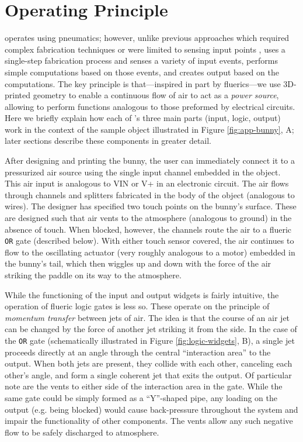   \section{\al Operating Principle}
    \al operates using pneumatics; however, unlike previous approaches
    which required complex fabrication techniques
    \cite{He:2017,Vazquez:2015,Slyper:2012} or were limited to sensing
    input points \cite{Tejada:2018, Tejada:2020}, \al uses a single-step
    fabrication process and senses a variety of input events, performs
    simple computations based on those events, and creates output based on
    the computations. The key principle is that---inspired in part by
    fluerics---we use 3D-printed geometry to enable a continuous flow of
    air to act as a \textit{power source}, allowing \al to perform
    functions analogous to those preformed by electrical circuits. Here we
    briefly explain how each of \al's three main parts (input, logic,
    output) work in the context of the sample object illustrated in
    Figure \ref{fig:app-bunny}, A; later sections describe these components in
    greater detail.

    After designing and printing the bunny, the user can immediately
    connect it to a pressurized air source using the single input channel
    embedded in the object. This air input is analogous to VIN or V+ in an
    electronic circuit. The air flows through channels and splitters
    fabricated in the body of the object (analogous to wires). The designer
    has specified two touch points on the bunny's surface. These are
    designed such that air vents to the atmosphere (analogous to ground) in
    the absence of touch. When blocked, however, the channels route the air
    to a flueric \texttt{OR} gate (described below). With either touch
    sensor covered, the air continues to flow to the oscillating actuator
    (very roughly analogous to a motor) embedded in the bunny's tail, which
    then wiggles up and down with the force of the air striking the paddle
    on its way to the atmosphere.

    While the functioning of the input and output widgets is fairly
    intuitive, the operation of flueric logic gates is less so.
    These operate on the principle of \textit{momentum transfer}
    between jets of air. The idea is that the course of an air jet
    can be changed by the force of another jet striking it from the
    side. In the case of the \texttt{OR} gate (schematically
    illustrated in Figure \ref{fig:logic-widgets}, B), a single jet proceeds
    directly at an angle through the central ``interaction area'' to the
    output. When both jets are present, they collide with each other,
    canceling each other's angle, and form a single coherent jet that exits
    the output. Of particular note are the vents to either side of the
    interaction area in the gate. While the same gate could be simply
    formed as a ``Y''-shaped pipe, any loading on the output (e.g. being
    blocked) would cause back-pressure throughout the system and impair the
    functionality of other components. The vents allow any such negative
    flow to be safely discharged to atmosphere.

